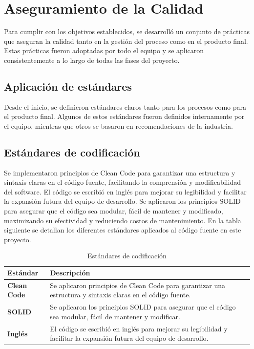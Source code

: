 \section{Aseguramiento de la Calidad}\label{sec:aseguramientoDeLaCalidad}

Para cumplir con los objetivos establecidos, se desarrolló un conjunto de prácticas que aseguran la calidad tanto en la 
gestión del proceso como en el producto final. Estas prácticas fueron adoptadas por todo el equipo y se aplicaron 
consistentemente a lo largo de todas las fases del proyecto.

\subsection{Aplicación de estándares}
Desde el inicio, se definieron estándares claros tanto para los procesos como para el producto final. Algunos de estos 
estándares fueron definidos internamente por el equipo, mientras que otros se basaron en recomendaciones de la industria.

\subsection{Estándares de codificación}
Se implementaron principios de Clean Code para garantizar una estructura y sintaxis claras en el código fuente, facilitando 
la comprensión y modificabilidad del software. El código se escribió en inglés para mejorar su legibilidad y facilitar la 
expansión futura del equipo de desarrollo. Se aplicaron los principios SOLID para asegurar que el código sea modular, fácil 
de mantener y modificado, maximizando su efectividad y reduciendo costos de mantenimiento.
En la tabla siguiente se detallan los diferentes estándares aplicados al código fuente en este proyecto.

\begin{table}[H]
    \centering
    \begin{tabular}{p{3cm} p{10cm}}
    \hline
    \rowcolor[HTML]{C0C0C0} 
    \textbf{Estándar} & \textbf{Descripción}                                                                                     \\ \hline
    \textbf{Clean Code} & Se aplicaron principios de Clean Code para garantizar una estructura y sintaxis claras en el código fuente. \\ \hline
    \textbf{SOLID}     & Se aplicaron los principios SOLID para asegurar que el código sea modular, fácil de mantener y modificar.       \\ \hline
    \textbf{Inglés}    & El código se escribió en inglés para mejorar su legibilidad y facilitar la expansión futura del equipo de desarrollo. \\ \hline
    \end{tabular}
    \caption{Estándares de codificación}
    \label{tab:estandaresCodificacion}
\end{table}


